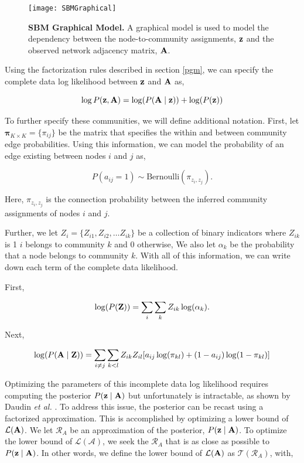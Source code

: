 \begin{figure}
\begin{center}
\texttt{[image: SBMGraphical]}
\caption{{\bf SBM Graphical Model.} A graphical model is used to model the dependency between the node-to-community assignments, ${\bf z}$ and the observed network adjacency matrix, ${\bf A}$.}
\label{fig:graphical}
\end{center}
\end{figure}

Using the factorization rules described in section \ref{pgm}, we can specify the complete data log likelihood between ${\bf z}$ and ${\bf A}$ as,

\begin{equation}
\log P({\bf z},{\bf A})=\log(P({\bf A} \mid {\bf z}))+\log(P({\bf z}))
\end{equation}

To further specify these communities, we will define additional notation. First, let ${\boldsymbol \pi}_{K \times K}=\{\pi_{ij}\}$ be the matrix that specifies the within and between community edge probabilities. Using this information, we can model the probability of an edge existing between nodes $i$ and $j$ as,

\begin{equation}
P(a_{ij}=1)\sim \text{Bernoulli}(\pi_{z_{i},z_{j}}).
\end{equation}

Here, $\pi_{z_{i},z_{j}}$ is the connection probability between the inferred community assignments of nodes $i$ and $j$. 

Further, we let $Z_{i}=\{Z_{i1},Z_{i2}, \dots Z_{ik}\}$ be a collection of binary indicators where $Z_{ik}$ is 1 $i$ belongs to community $k$ and 0 otherwise, We also let $\alpha_{k}$ be the probability that a node belongs to community $k$. With all of this information, we can write down each term of the complete data likelihood.

First,

\begin{equation}
\log(P({\bf Z}))=\sum_{i}\sum_{k}Z_{ik}\log(\alpha_{k}).
\end{equation}

Next,

\begin{equation}
\log(P({\bf A} \mid {\bf Z}))=\sum_{i\ne j}\sum_{k< l}Z_{ik}Z_{il}[a_{ij}\log (\pi_{kl})+(1-a_{ij})\log(1-\pi_{kl})]
\end{equation}

Optimizing the parameters of this incomplete data log likelihood requires computing the posterior $P({\bf z} \mid {\bf A})$ but unfortunately is intractable, as shown by Daudin \emph{et al.} \cite{dudin}. To address this issue, the posterior can be recast using a factorized approximation. This is accomplished by optimizing a lower bound of $\mathcal{L}({\bf A})$. We let $\mathcal{R}_{A}$ be an approximation of the posterior, $P({\bf z} \mid {\bf A})$. To optimize the lower bound of $\mathcal{L}(\mathcal{A})$, we seek the $\mathcal{R}_{A}$ that is as close as possible to $P({\bf z} \mid {\bf A})$. In other words, we define the lower bound of $\mathcal{L}({\bf A})$ as $\mathcal{T}(\mathcal{R}_{A})$, with,

